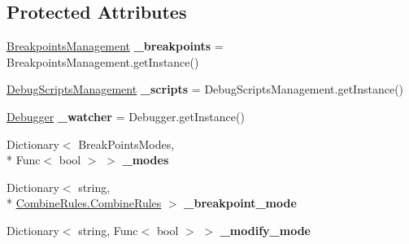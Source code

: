 \subsection*{Protected Attributes}
\begin{DoxyCompactItemize}
\item 
\hypertarget{classlib_watcher_dialog_1_1_break_points_ref_a0a1859c49825160c93af40bece50f4af}{\hyperlink{classlib_watcher_dialog_1_1_property_item_1_1_break_point_1_1_breakpoints_management}{Breakpoints\+Management} {\bfseries \+\_\+breakpoints} = Breakpoints\+Management.\+get\+Instance()}\label{classlib_watcher_dialog_1_1_break_points_ref_a0a1859c49825160c93af40bece50f4af}

\item 
\hypertarget{classlib_watcher_dialog_1_1_break_points_ref_a68dfc15c30bb5877398e44f275313ca0}{\hyperlink{classlib_watcher_dialog_1_1_property_item_1_1_debug_script_1_1_debug_scripts_management}{Debug\+Scripts\+Management} {\bfseries \+\_\+scripts} = Debug\+Scripts\+Management.\+get\+Instance()}\label{classlib_watcher_dialog_1_1_break_points_ref_a68dfc15c30bb5877398e44f275313ca0}

\item 
\hypertarget{classlib_watcher_dialog_1_1_break_points_ref_a9444336ac554a8f8ee411f48fb910d69}{\hyperlink{class_watcher_1_1_debugger_1_1_debugger}{Debugger} {\bfseries \+\_\+watcher} = Debugger.\+get\+Instance()}\label{classlib_watcher_dialog_1_1_break_points_ref_a9444336ac554a8f8ee411f48fb910d69}

\item 
\hypertarget{classlib_watcher_dialog_1_1_break_points_ref_aa106e372a1688b0bdde3848db92a0279}{Dictionary$<$ Break\+Points\+Modes, \\*
Func$<$ bool $>$ $>$ {\bfseries \+\_\+modes}}\label{classlib_watcher_dialog_1_1_break_points_ref_aa106e372a1688b0bdde3848db92a0279}

\item 
\hypertarget{classlib_watcher_dialog_1_1_break_points_ref_abdf244d3e9a8ce2d66c00ed422468d47}{Dictionary$<$ string, \\*
\hyperlink{classlib_watcher_dialog_1_1_combine_rules_1_1_combine_rules}{Combine\+Rules.\+Combine\+Rules} $>$ {\bfseries \+\_\+breakpoint\+\_\+mode}}\label{classlib_watcher_dialog_1_1_break_points_ref_abdf244d3e9a8ce2d66c00ed422468d47}

\item 
\hypertarget{classlib_watcher_dialog_1_1_break_points_ref_adc80cd5860d8ffe6d44ec57cf62f960c}{Dictionary$<$ string, Func$<$ bool $>$ $>$ {\bfseries \+\_\+modify\+\_\+mode}}\label{classlib_watcher_dialog_1_1_break_points_ref_adc80cd5860d8ffe6d44ec57cf62f960c}


\end{DoxyCompactItemize}
